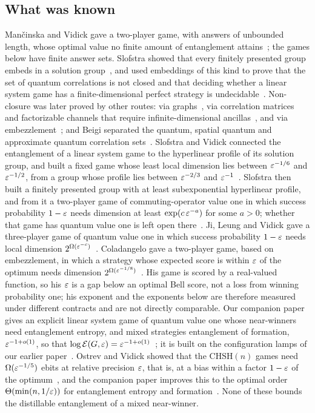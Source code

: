 \subsection{What was known}\label{sec:intro-known}

Man\v{c}inska and Vidick gave a two-player game, with answers of unbounded length, whose optimal value no finite amount of
entanglement attains~\cite{MV14}; the games below have finite answer sets. Slofstra showed that every finitely presented group
embeds in a solution group~\cite{Slo20}, and used embeddings of this kind to prove that the set of quantum correlations is not
closed and that deciding whether a linear system game has a finite-dimensional perfect strategy is undecidable~\cite{Slo19}.
Non-closure was later proved by other routes: via graphs~\cite{DPP19}, via correlation matrices
and factorizable channels that require infinite-dimensional ancillas~\cite{MR20}, and via embezzlement~\cite{Col20}; and Beigi
separated the quantum, spatial quantum and approximate quantum correlation sets~\cite{Bei21}. Slofstra and Vidick connected the entanglement of a linear system game to the hyperlinear profile of its
solution group, and built a fixed game whose least local dimension lies between $\varepsilon^{-1/6}$ and $\varepsilon^{-1/2}$, from a group whose
profile lies between $\varepsilon^{-2/3}$ and $\varepsilon^{-1}$~\cite[Theorem~1.1 and Proposition~3.2]{SV18}. Slofstra then built a finitely
presented group with at least subexponential hyperlinear profile, and from it a two-player game of commuting-operator value one in
which success probability $1-\varepsilon$ needs dimension at least $\exp(c\,\varepsilon^{-a})$ for some $a>0$; whether that game has quantum value
one is left open there~\cite[Theorem~1.2 and Corollary~1.4]{Slo18}. Ji, Leung and Vidick gave a three-player game of quantum value
one in which success probability $1-\varepsilon$ needs local dimension $2^{\Omega(\varepsilon^{-c})}$~\cite[Theorem~1]{JLV20}. Coladangelo gave a
two-player game, based on embezzlement, in which a strategy whose expected score is within $\varepsilon$ of the optimum needs dimension
$2^{\Omega(\varepsilon^{-1/8})}$~\cite[Theorems~1 and~5]{Col20}. His game is scored by a real-valued function, so his $\varepsilon$ is a gap below an
optimal Bell score, not a loss from winning probability one; his exponent and the exponents below are therefore measured under
different contracts and are not directly comparable. Our companion paper gives an explicit linear system game of quantum value
one whose near-winners need entanglement entropy, and mixed strategies entanglement of formation, $\varepsilon^{-1+o(1)}$, so that
$\log\mathcal E(G,\varepsilon)=\varepsilon^{-1+o(1)}$~\cite[Theorem~A]{DM-game}; it is built on the configuration lamps of our earlier
paper~\cite{DM-lamps}. Ostrev and Vidick showed that the $\mathrm{CHSH}(n)$ games need $\Omega(\varepsilon^{-1/5})$ ebits at relative
precision $\varepsilon$, that is, at a bias within a factor $1-\varepsilon$ of the optimum~\cite{OV16}, and the companion paper improves this to
the optimal order $\Theta(\min(n,1/\varepsilon))$ for entanglement entropy and formation~\cite[Theorem~E]{DM-game}. None of these bounds
the distillable entanglement of a mixed near-winner.

